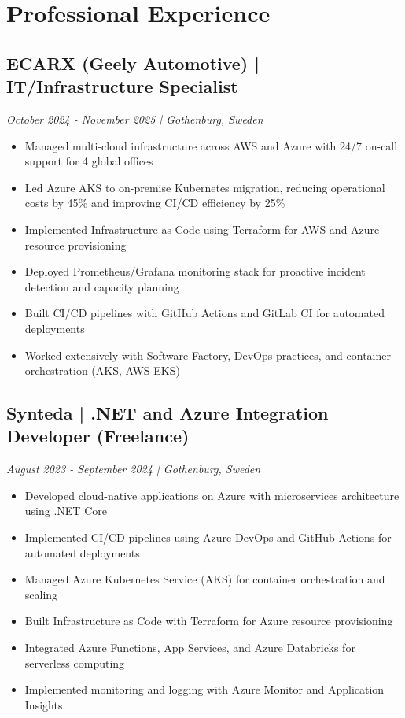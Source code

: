 \documentclass[11pt,a4paper]{article}
\begin{document}
\section*{Professional Experience}
\subsection*{ECARX (Geely Automotive) | IT/Infrastructure Specialist}
\textit{October 2024 - November 2025 | Gothenburg, Sweden}
\begin{itemize}[noitemsep]
\item Managed multi-cloud infrastructure across AWS and Azure with 24/7 on-call support for 4 global offices
\item Led Azure AKS to on-premise Kubernetes migration, reducing operational costs by 45\% and improving CI/CD efficiency by 25\%
\item Implemented Infrastructure as Code using Terraform for AWS and Azure resource provisioning
\item Deployed Prometheus/Grafana monitoring stack for proactive incident detection and capacity planning
\item Built CI/CD pipelines with GitHub Actions and GitLab CI for automated deployments
\item Worked extensively with Software Factory, DevOps practices, and container orchestration (AKS, AWS EKS)
\end{itemize}

\subsection*{Synteda | .NET and Azure Integration Developer (Freelance)}
\textit{August 2023 - September 2024 | Gothenburg, Sweden}
\begin{itemize}[noitemsep]
\item Developed cloud-native applications on Azure with microservices architecture using .NET Core
\item Implemented CI/CD pipelines using Azure DevOps and GitHub Actions for automated deployments
\item Managed Azure Kubernetes Service (AKS) for container orchestration and scaling
\item Built Infrastructure as Code with Terraform for Azure resource provisioning
\item Integrated Azure Functions, App Services, and Azure Databricks for serverless computing
\item Implemented monitoring and logging with Azure Monitor and Application Insights
\end{itemize}
\end{document}
